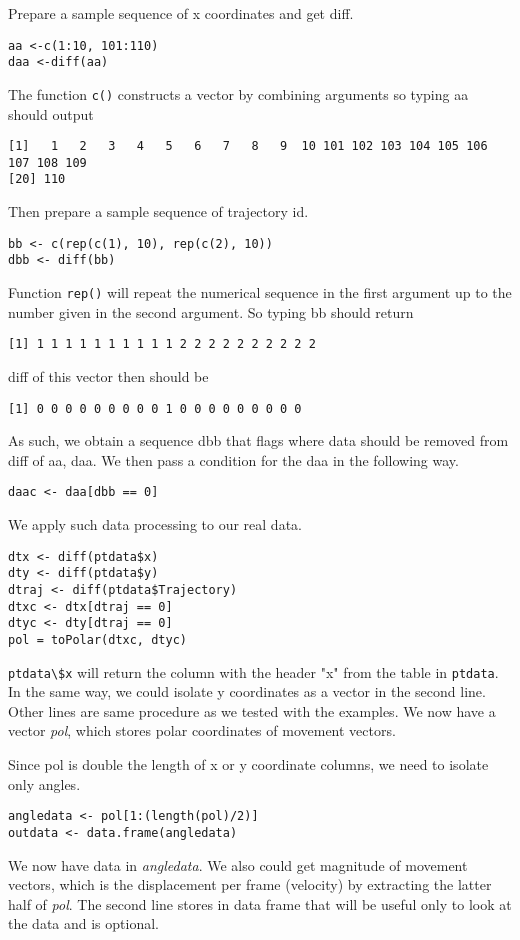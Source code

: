 \documentclass[11pnt]{article}
\begin{document}
\begin{description}
Prepare a sample sequence of x coordinates and get diff. 
\begin{verbatim}
aa <-c(1:10, 101:110)
daa <-diff(aa)
\end{verbatim}
The function \verb"c()" constructs a vector by combining arguments so typing aa should output
\begin{verbatim}
[1]   1   2   3   4   5   6   7   8   9  10 101 102 103 104 105 106 107 108 109
[20] 110
\end{verbatim}
Then prepare a sample sequence of trajectory id. 
\begin{verbatim}
bb <- c(rep(c(1), 10), rep(c(2), 10))
dbb <- diff(bb)
\end{verbatim}
Function \verb"rep()" will repeat the numerical sequence in the first argument up to the number given in the second argument. So typing bb should return 
\begin{verbatim}
[1] 1 1 1 1 1 1 1 1 1 1 2 2 2 2 2 2 2 2 2 2
\end{verbatim}
diff of this vector then should be
\begin{verbatim}
[1] 0 0 0 0 0 0 0 0 0 1 0 0 0 0 0 0 0 0 0
\end{verbatim}
As such, we obtain a sequence dbb that flags where data should be removed from diff of aa, daa. We then pass a condition for the daa in the following way. 
\begin{verbatim}
daac <- daa[dbb == 0]
\end{verbatim}
We apply such data processing to our real data. 
\begin{verbatim}
dtx <- diff(ptdata$x)
dty <- diff(ptdata$y)
dtraj <- diff(ptdata$Trajectory)
dtxc <- dtx[dtraj == 0]
dtyc <- dty[dtraj == 0]
pol = toPolar(dtxc, dtyc)
\end{verbatim}
\verb"ptdata\$x" will return the column with the header "x" from the table in \verb"ptdata". In the same way, we could isolate y coordinates as a vector in the second line. Other lines are same procedure as we tested with the examples. We now have a vector \textit{pol}, which stores polar coordinates of movement vectors.   

Since pol is double the length of x or y coordinate columns, we need to isolate only angles.
\begin{verbatim}
angledata <- pol[1:(length(pol)/2)]
outdata <- data.frame(angledata)
\end{verbatim}
We now have data in \textit{angledata}. We also could get magnitude of movement vectors, which is the displacement per frame (velocity) by extracting the latter half of \textit{pol}. The second line stores in data frame that will be useful only to look at the data and is optional.


\end{description}
\end{document}
